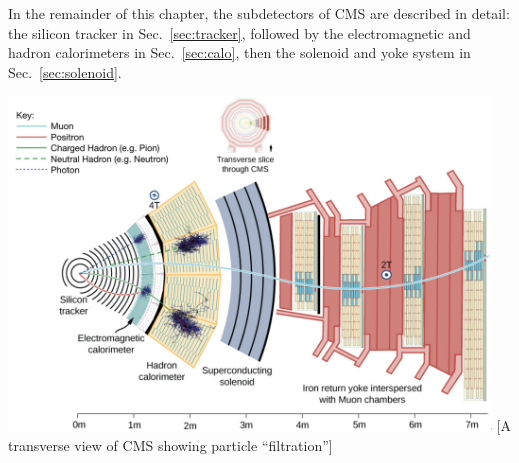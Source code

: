 In the remainder of this chapter, the subdetectors of CMS are described in detail:
the silicon tracker in Sec.~\ref{sec:tracker},
followed by the electromagnetic and hadron calorimeters in Sec.~\ref{sec:calo},
then the solenoid and yoke system in Sec.~\ref{sec:solenoid}.
\begin{multiFigure}
    \centering
    \includegraphics[width=0.96\textwidth,keepaspectratio]{figures/cms/cms_transverse_particletrajectories_corrected.png}
        [A transverse view of CMS showing particle ``filtration'']
        {
}
\end{multiFigure}
